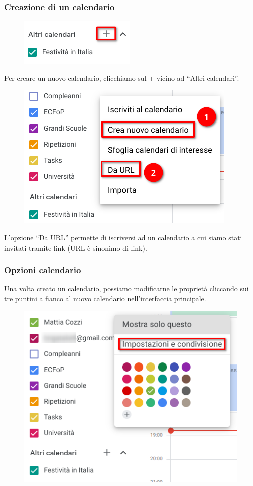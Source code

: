 \documentclass[]{beamer}
\begin{document}
\begin{frame}
\frametitle{Creazione di un calendario}
\begin{figure}
  \includegraphics[width=.2\columnwidth]{img/calendarnuovocal.png}
\end{figure}
Per creare un nuovo calendario, clicchiamo sul + vicino ad ``Altri calendari''.

\begin{figure}
  \includegraphics[width=.4\columnwidth]{img/calendarnuovocal2.png}
\end{figure}
L'opzione ``Da URL'' permette di iscriversi ad un calendario a cui siamo stati invitati tramite link (URL è sinonimo di link).
\end{frame}


\begin{frame}
\frametitle{Opzioni calendario}
Una volta creato un calendario, possiamo modificarne le proprietà cliccando sui tre puntini a fianco al nuovo calendario nell'interfaccia principale.

\begin{figure}
  \includegraphics[width=.5\columnwidth]{img/calendarcalmod.png}
\end{figure}
\end{frame}
\end{document}
